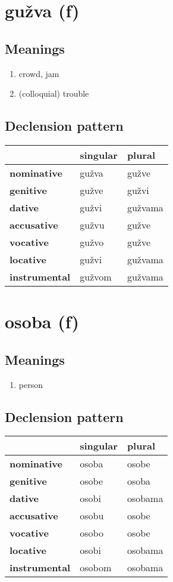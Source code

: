 \filbreak
\section{gužva (f)}
\subsection*{Meanings}
\begin{enumerate}
\item crowd, jam
\item (colloquial) trouble
\end{enumerate}
\subsection*{Declension pattern}
\begin{tabularx}{\linewidth}{Xll}
\toprule
{} & singular &   plural \\
\midrule
\textbf{nominative  } &    gužva &    gužve \\
\textbf{genitive    } &    gužve &    gužvi \\
\textbf{dative      } &    gužvi &  gužvama \\
\textbf{accusative  } &    gužvu &    gužve \\
\textbf{vocative    } &    gužvo &    gužve \\
\textbf{locative    } &    gužvi &  gužvama \\
\textbf{instrumental} &   gužvom &  gužvama \\
\bottomrule
\end{tabularx}

\filbreak
\section{osoba (f)}
\subsection*{Meanings}
\begin{enumerate}
\item person
\end{enumerate}
\subsection*{Declension pattern}
\begin{tabularx}{\linewidth}{Xll}
\toprule
{} & singular &   plural \\
\midrule
\textbf{nominative  } &    osoba &    osobe \\
\textbf{genitive    } &    osobe &    osoba \\
\textbf{dative      } &    osobi &  osobama \\
\textbf{accusative  } &    osobu &    osobe \\
\textbf{vocative    } &    osobo &    osobe \\
\textbf{locative    } &    osobi &  osobama \\
\textbf{instrumental} &   osobom &  osobama \\
\bottomrule
\end{tabularx}

